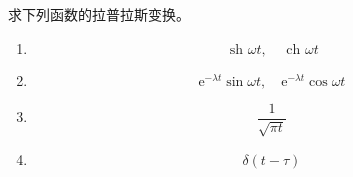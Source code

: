 \begin{exercise}{}
求下列函数的拉普拉斯变换。

\begin{enumerate}
\item \begin{equation}
\text { sh } \omega t, \quad \text { ch } \omega t
\end{equation}
\item \begin{equation}
\mathrm{e}^{-\lambda t} \sin \omega t, \quad \mathrm{e}^{-\lambda t} \cos \omega t
\end{equation}
\item \begin{equation}
\frac{1}{\sqrt{\pi t}}
\end{equation}
\item \begin{equation}
\delta(t-\tau)
\end{equation}
\end{enumerate}
\end{exercise}